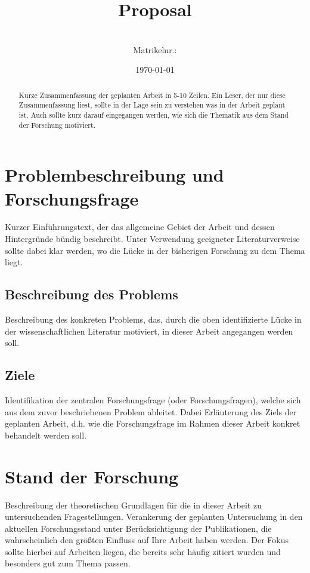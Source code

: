 \documentclass[ngerman, a4paper, abstract=false, twoside=false, parskip=half, DIV=12, bibtotoc]{scrartcl}
\title{Proposal}
\subtitle{\titel}
\author{\autor \\ {\small Matrikelnr.: \matrikelnr}}
\date{\today}
\begin{document}
\maketitle

\begin{abstract}%
Kurze Zusammenfassung der geplanten Arbeit in 5-10 Zeilen. Ein Leser, der nur diese Zusammenfassung liest, sollte in der Lage sein zu verstehen was in der Arbeit geplant ist. Auch sollte kurz darauf eingegangen werden, wie sich die Thematik aus dem Stand der Forschung motiviert.
\end{abstract}


\section{Problembeschreibung und Forschungsfrage}
Kurzer Einführungstext, der das allgemeine Gebiet der Arbeit und dessen Hintergründe bündig beschreibt. Unter Verwendung geeigneter Literaturverweise sollte dabei klar werden, wo die Lücke in der bisherigen Forschung zu dem Thema liegt.

\subsection{Beschreibung des Problems}
Beschreibung des konkreten Problems, das, durch die oben identifizierte Lücke in der wissenschaftlichen Literatur motiviert, in dieser Arbeit angegangen werden soll.

\subsection{Ziele}
Identifikation der zentralen Forschungsfrage (oder Forschungsfragen), welche sich aus dem zuvor beschriebenen Problem ableitet. Dabei Erläuterung des Ziels der geplanten Arbeit, d.h. wie die Forschungsfrage im Rahmen dieser Arbeit konkret behandelt werden soll.


\section{Stand der Forschung}
Beschreibung der theoretischen Grundlagen für die in dieser Arbeit zu untersuchenden Fragestellungen. Verankerung der geplanten Untersuchung in den aktuellen Forschungsstand unter Berücksichtigung der Publikationen, die wahrscheinlich den größten Einfluss auf Ihre Arbeit haben werden. Der Fokus sollte hierbei auf Arbeiten liegen, die bereits sehr häufig zitiert wurden und besonders gut zum Thema passen.
\end{document}
